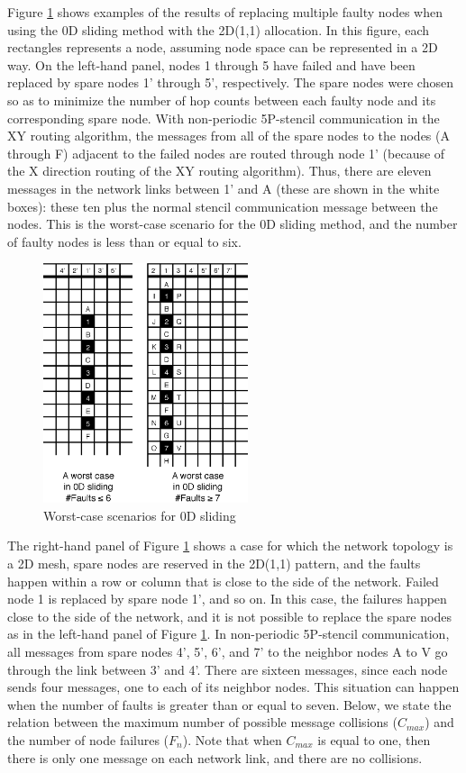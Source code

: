 \documentclass[Afour,times,sageh]{sagej}
\begin{document}
Figure \ref{fig:0d-worst-cases} shows examples of the results of
replacing multiple faulty nodes when using the 0D sliding method with
the 2D(1,1) allocation. In this figure, each rectangles represents a
node, assuming node space can be represented in a 2D way. On the
left-hand panel, nodes 1 through 5 have failed and have been replaced
by spare nodes 1' through 5', respectively. The spare nodes were
chosen so as to minimize the number of hop counts between each faulty
node and its corresponding spare node. With non-periodic 5P-stencil
communication in the XY routing algorithm, the messages from all of
the spare nodes to the nodes (A through F) adjacent to the failed
nodes are routed through node 1' (because of the X direction routing
of the XY routing algorithm). Thus, there are eleven messages in the
network links between 1' and A  (these are shown in the white boxes):
these ten plus the normal stencil communication message between the
nodes. This is the worst-case scenario for the 0D sliding method, and
the number of faulty nodes is less than or equal to six.

\begin{figure}[ht]
\centering
\includegraphics[width=60mm]{Figs/0D-WorstCases.eps}
  \caption{Worst-case scenarios for 0D sliding}
  \label{fig:0d-worst-cases}
\end{figure}

The right-hand panel of Figure \ref{fig:0d-worst-cases} shows a case
for which the network topology is a 2D mesh, spare nodes are reserved
in the 2D(1,1) pattern, and the faults happen within a row or column
that is close to the side of the network. Failed node 1 is replaced by
spare node 1', and so on. In this case, the failures happen close to
the side of the network, and it is not possible to replace the spare
nodes as in the left-hand panel of Figure \ref{fig:0d-worst-cases}. In
non-periodic 5P-stencil communication, all messages from spare nodes
4', 5', 6', and 7' to the neighbor nodes A to V go through the link
between 3' and 4'. There are sixteen messages, since each node sends
four messages, one to each of its neighbor nodes. This situation can
happen when the number of faults is greater than or equal to
seven. Below, we state the relation between the maximum number of
possible message collisions ($C_{max}$) and the number of node
failures ($F_n$). Note that when $C_{max}$ is equal to one, then there
is only one message on each network link, and there are no collisions.
\end{document}
